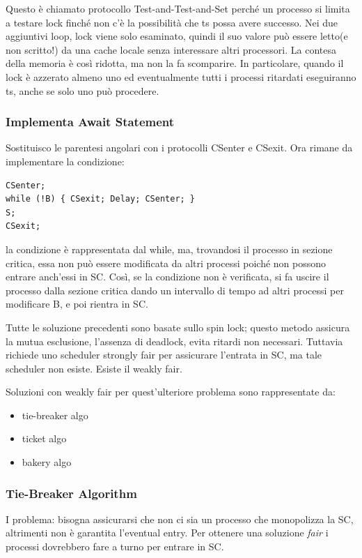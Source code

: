 \documentclass[10pt,a4paper]{article}
\begin{document}
Questo è chiamato protocollo Test-and-Test-and-Set perché un processo si limita a testare lock finché non c'è la possibilità che ts possa avere successo. Nei due aggiuntivi loop, lock viene solo esaminato, quindi il suo valore può essere letto(e non scritto!) da una cache locale senza interessare altri processori. La contesa della memoria è così ridotta, ma non la fa scomparire. In particolare, quando il lock è azzerato almeno uno ed eventualmente tutti i processi ritardati eseguiranno ts, anche se solo uno può procedere.

\subsubsection{Implementa Await Statement}
Sostituisco le parentesi angolari con i protocolli CSenter e CSexit.
Ora rimane da implementare la condizione: 
\begin{verbatim}
CSenter;
while (!B) { CSexit; Delay; CSenter; }
S;
CSexit;
\end{verbatim}
la condizione è rappresentata dal while, ma, trovandosi il processo in sezione critica, essa non può essere modificata da altri processi poiché non possono entrare anch'essi in SC. Così, se la condizione non è verificata, si fa uscire il processo dalla sezione critica dando un intervallo di tempo ad altri processi per modificare B, e poi rientra in SC.

Tutte le soluzione precedenti sono basate sullo spin lock; questo metodo assicura la mutua esclusione, l'assenza di deadlock, evita ritardi non necessari. Tuttavia richiede uno scheduler strongly fair per assicurare l'entrata in SC, ma tale scheduler non esiste. Esiste il weakly fair.

Soluzioni con weakly fair per quest'ulteriore problema sono rappresentate da:
\begin{itemize}
\item tie-breaker algo
\item ticket algo
\item bakery algo
\end{itemize}

\subsubsection{Tie-Breaker Algorithm}
I problema: bisogna assicurarsi che non ci sia un processo che monopolizza la SC, altrimenti non è garantita l'eventual entry. Per ottenere una soluzione \textit{fair} i processi dovrebbero fare a turno per entrare in SC.
\end{document}
